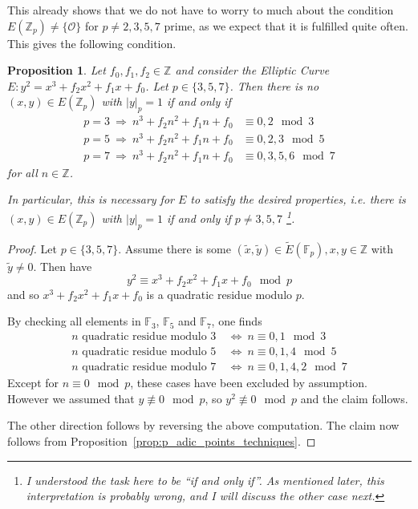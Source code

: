 \documentclass{scrartcl}
\newcommand{\Z}{\mathbb{Z}}
\newcommand{\F}{\mathbb{F}}
\renewcommand{\O}{\mathcal{O}}
\newtheorem{prop}{Proposition}
\theoremstyle{definition}
\begin{document}
This already shows that we do not have to worry to much about the condition $E(\Z_p) \neq \{\O\}$ for $p \neq 2, 3, 5, 7$ prime, as we expect that it is fulfilled quite often.
This gives the following condition.
\begin{prop}
    Let $f_0, f_1, f_2 \in \Z$ and consider the Elliptic Curve $E: y^2 = x^3 + f_2 x^2 + f_1 x + f_0$.
    Let $p \in \{3, 5, 7\}$.
    Then there is no $(x, y) \in E(\Z_p)$ with $|y|_p = 1$ if and only if
    \begin{align*}
        p = 3 \ \Rightarrow \ n^3 + f_2 n^2 + f_1 n + f_0 &\equiv 0, 2 \mod 3 \\
        p = 5 \ \Rightarrow \ n^3 + f_2 n^2 + f_1 n + f_0 &\equiv 0, 2, 3 \mod 5 \\
        p = 7 \ \Rightarrow \ n^3 + f_2 n^2 + f_1 n + f_0 &\equiv 0, 3, 5, 6 \mod 7
    \end{align*}
    for all $n \in \Z$.
    
    In particular, this is necessary for $E$ to satisfy the desired properties, i.e. there is $(x, y) \in E(\Z_p)$ with $|y|_p = 1$ if and only if $p \neq 3, 5, 7$
    \footnote{I understood the task here to be ``if and only if''. As mentioned later, this interpretation is probably wrong, and I will discuss the other case next.}.
\end{prop}
\begin{proof}
    Let $p \in \{3, 5, 7\}$.
    Assume there is some $(\tilde{x}, \tilde{y}) \in \tilde{E}(\F_p), x, y \in \Z$ with $\tilde{y} \neq 0$.
    Then have
    \begin{equation*}
        y^2 \equiv x^3 + f_2 x^2 + f_1 x + f_0 \mod p
    \end{equation*}
    and so $x^3 + f_2 x^2 + f_1 x + f_0$ is a quadratic residue modulo $p$.
    
    By checking all elements in $\F_3$, $\F_5$ and $\F_7$, one finds
    \begin{align*}
        \text{$n$ quadratic residue modulo $3$} \ &\Leftrightarrow \ n \equiv 0, 1 \mod 3 \\
        \text{$n$ quadratic residue modulo $5$} \ &\Leftrightarrow \ n \equiv 0, 1, 4 \mod 5 \\
        \text{$n$ quadratic residue modulo $7$} \ &\Leftrightarrow \ n \equiv 0, 1, 4, 2 \mod 7
    \end{align*}
    Except for $n \equiv 0 \mod p$, these cases have been excluded by assumption.
    However we assumed that $y \not\equiv 0 \mod p$, so $y^2 \not\equiv 0 \mod p$ and the claim follows.

    The other direction follows by reversing the above computation.
    The claim now follows from Proposition~\ref{prop:p_adic_points_techniques}.
\end{proof}
\end{document}
